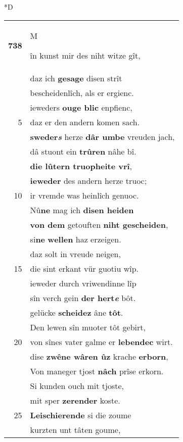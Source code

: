\documentclass[8pt,a4paper,notitlepage]{article}
\begin{document}
\begin{table}[ht]
\begin{minipage}[t]{0.5\linewidth}
\small
\begin{center}*D
\end{center}
\begin{tabular}{rl}
\textbf{738} & \begin{large}M\end{large}în kunst mir des niht witze gît,\\ 
 & daz ich \textbf{gesage} disen strît\\ 
 & bescheidenlîch, als er ergienc.\\ 
 & ieweders \textbf{ouge blic} enpfienc,\\ 
5 & daz er den andern komen sach.\\ 
 & \textbf{sweder\textit{s}} herze \textbf{dâr umbe} vreuden jach,\\ 
 & dâ stuont ein \textbf{trûren} nâhe bî.\\ 
 & \textbf{die lûtern truopheite vrî},\\ 
 & \textbf{ieweder} des andern herze truoc;\\ 
10 & ir vremde was heinlîch genuoc.\\ 
 & Nû\textbf{ne} mag ich \textbf{disen heiden}\\ 
 & \textbf{von dem} getouften \textbf{niht gescheiden},\\ 
 & si\textbf{ne} \textbf{wellen} haz erzeigen.\\ 
 & daz solt in vreude neigen,\\ 
15 & die sint erkant vür guotiu wîp.\\ 
 & ieweder durch vriwendinne lîp\\ 
 & sîn verch gein \textbf{der hert\textit{e}} bôt.\\ 
 & gelücke \textbf{scheidez} âne \textbf{tôt}.\\ 
 & Den lewen sîn muoter tôt gebirt,\\ 
20 & von sînes vater galme er \textbf{lebendec} wirt.\\ 
 & dise \textbf{zwêne wâren ûz} krache \textbf{erborn},\\ 
 & Von maneger tjost \textbf{nâch} prîse erkorn.\\ 
 & Si kunden ouch mit tjoste,\\ 
 & mit sper \textbf{zerender} koste.\\ 
25 & \textbf{Leischierende} si die zoume\\ 
 & kurzten unt tâten goume,\\ 

\end{tabular}
\end{minipage}
\end{table}
\end{document}
